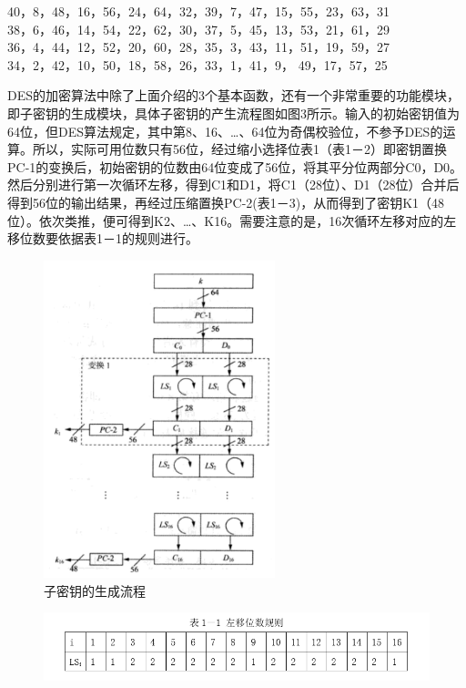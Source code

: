 \documentclass[UTF8,a4paper]{article}
\begin{document}
\begin{center}
40，8，48，16，56，24，64，32，39，7，47，15，55，23，63，31\\
38，6，46，14，54，22，62，30，37，5，45，13，53，21，61，29\\
36，4，44，12，52，20，60，28，35，3，43，11，51，19，59，27\\
34，2，42，10，50，18，58，26，33，1，41，9， 49，17，57，25\par 

\end{center}
DES的加密算法中除了上面介绍的3个基本函数，还有一个非常重要的功能模块，即子密钥的生成模块，具体子密钥的产生流程图如图3所示。输入的初始密钥值为64位，但DES算法规定，其中第8、16、…、64位为奇偶校验位，不参予DES的运算。所以，实际可用位数只有56位，经过缩小选择位表1（表1－2）即密钥置换PC-1的变换后，初始密钥的位数由64位变成了56位，将其平分位两部分C0，D0。然后分别进行第一次循环左移，得到C1和D1，将C1（28位）、D1（28位）合并后得到56位的输出结果，再经过压缩置换PC-2(表1－3)，从而得到了密钥K1（48位）。依次类推，便可得到K2、…、K16。需要注意的是，16次循环左移对应的左移位数要依据表1－1的规则进行。
		\begin{figure}[!ht]
	
	\centering
	\includegraphics[width=0.6\textwidth]{1-3.PNG}
	\caption{子密钥的生成流程}
	\label{fig:1-3}
\end{figure}

		\begin{figure}[!ht]
	\includegraphics[width=1.0\textwidth]{c1.PNG}
\end{figure}
\end{document}
